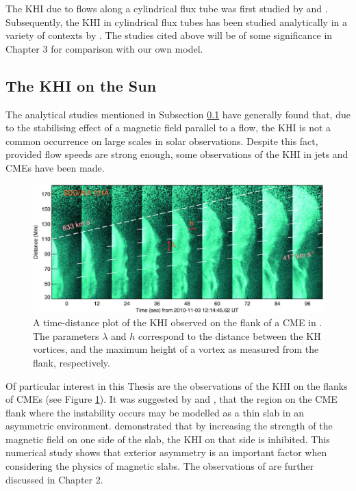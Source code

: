 The KHI due to flows along a cylindrical flux tube was first studied by \cite{Somasundaram1999} and \cite{Terra-Homem2003}.
Subsequently, the KHI in cylindrical flux tubes has been studied analytically in a variety of contexts by \cite{Zaqarashvili2010, Soler2010, Zhelyazkov2012, Zaqarashvili2014a, Zaqarashvili2014b, Zaqarashvili2015}.
The studies cited above will be of some significance in Chapter 3 for comparison with our own model.

\subsection{The KHI on the Sun}
\label{subsec:khisun}

The analytical studies mentioned in Subsection \ref{subsec:khisun} have generally found that, due to the stabilising effect of a magnetic field parallel to a flow, the KHI is not a common occurrence on large scales in solar observations.
Despite this fact, provided flow speeds are strong enough, some observations of the KHI in jets and CMEs have been made.

\begin{figure}[t]
\centering
\includegraphics[width=\textwidth]{figures/khi_cme.jpg}
\caption{A time-distance plot of the KHI observed on the flank of a CME in \cite{Foullon2011}.
The parameters $\lambda$ and $h$ correspond to the distance between the KH vortices, and the maximum height of a vortex as measured from the flank, respectively.
}
\label{fig:khicme}
\end{figure}

Of particular interest in this Thesis are the observations of the KHI on the flanks of CMEs (see Figure \ref{fig:khicme}).
It was suggested by \cite{Foullon2011} and \cite{Mostl2013}, that the region on the CME flank where the instability occurs may be modelled as a thin slab in an asymmetric environment.
\cite{Mostl2013} demonstrated that by increasing the strength of the magnetic field on one side of the slab, the KHI on that side is inhibited.
This numerical study shows that exterior asymmetry is an important factor when considering the physics of magnetic slabs.
The observations of \cite{Ofman2011, Foullon2011, Mostl2013} are further discussed in Chapter 2.

